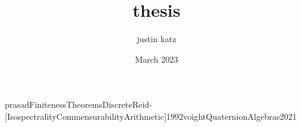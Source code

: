\documentclass{reedthesis}
\title{thesis}
\author{justin katz}
\date{March 2023}
\begin{document}
\newpage
% 
% 



%
% 
% 
% 

\newpage
\cite{weilBasicNumberTheory1974}
\cite{Leininger.McReynolds.Neumann.Reid-[LengthEigenvalueEquivalence]2007}

\cite{Borel-[CommensurabilityClassesVolumes]}
\cite{borelCohomologySpectrumArithmetic1984}{prasadFinitenessTheoremsDiscrete}{Reid-[IsospectralityCommensurabilityArithmetic]1992}{voightQuaternionAlgebras2021}
{}


\end{document}
